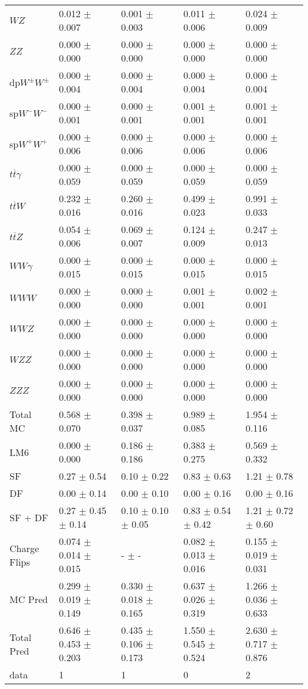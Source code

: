 \begin{tabular}{l | l l l l}
$WZ$ &  0.012 $\pm$  0.007 &  0.001 $\pm$  0.003 &  0.011 $\pm$  0.006 &  0.024 $\pm$  0.009\\
$ZZ$ &  0.000 $\pm$   0.000 &  0.000 $\pm$   0.000 &   0.000 $\pm$   0.000 &   0.000 $\pm$   0.000\\
\hline
dp$W^{\pm}W^{\pm}$ &  0.000 $\pm$  0.004 &  0.000 $\pm$  0.004 &  0.000 $\pm$  0.004 &  0.000 $\pm$  0.004\\
sp$W^{-}W^{-}$ &  0.000 $\pm$  0.001 &  0.000 $\pm$  0.001 &  0.001 $\pm$  0.001 &  0.001 $\pm$  0.001\\
sp$W^{+}W^{+}$ &  0.000 $\pm$  0.006 &  0.000 $\pm$  0.006 &  0.000 $\pm$  0.006 &  0.000 $\pm$  0.006\\
$t\overline{t}\gamma$ &  0.000 $\pm$  0.059 &  0.000 $\pm$  0.059 &  0.000 $\pm$  0.059 &  0.000 $\pm$  0.059\\
$t\overline{t}W$ &  0.232 $\pm$  0.016 &  0.260 $\pm$  0.016 &  0.499 $\pm$  0.023 &  0.991 $\pm$  0.033\\
$t\overline{t}Z$ &  0.054 $\pm$  0.006 &  0.069 $\pm$  0.007 &  0.124 $\pm$  0.009 &  0.247 $\pm$  0.013\\
$WW\gamma$ &  0.000 $\pm$  0.015 &  0.000 $\pm$  0.015 &  0.000 $\pm$  0.015 &  0.000 $\pm$  0.015\\
$WWW$ &   0.000 $\pm$   0.000 &   0.000 $\pm$   0.000 &  0.001 $\pm$  0.001 &  0.002 $\pm$  0.001\\
$WWZ$ &  0.000 $\pm$   0.000 &  0.000 $\pm$   0.000 &  0.000 $\pm$   0.000 &  0.000 $\pm$   0.000\\
$WZZ$ &   0.000 $\pm$   0.000 &   0.000 $\pm$   0.000 &   0.000 $\pm$   0.000 &   0.000 $\pm$   0.000\\
$ZZZ$ &  0.000 $\pm$   0.000 &   0.000 $\pm$   0.000 &   0.000 $\pm$   0.000 &   0.000 $\pm$   0.000\\
\hline
Total MC &  0.568 $\pm$  0.070 &  0.398 $\pm$  0.037 &  0.989 $\pm$  0.085 &  1.954 $\pm$  0.116\\
\hline\hline
\hline
LM6 &  0.000 $\pm$  0.000 &  0.186 $\pm$  0.186 &  0.383 $\pm$  0.275 &  0.569 $\pm$  0.332\\
\hline\hline
\hline\hline
 SF  & 0.27 $\pm$ 0.54 & 0.10 $\pm$ 0.22 & 0.83 $\pm$ 0.63 & 1.21 $\pm$ 0.78\\
 DF  & 0.00 $\pm$ 0.14 & 0.00 $\pm$ 0.10 & 0.00 $\pm$ 0.16 & 0.00 $\pm$ 0.16\\
\hline
 SF + DF  & 0.27 $\pm$ 0.45 $\pm$ 0.14 & 0.10 $\pm$ 0.10 $\pm$ 0.05 & 0.83 $\pm$ 0.54 $\pm$ 0.42 & 1.21 $\pm$ 0.72 $\pm$ 0.60\\
\hline\hline
Charge Flips & 0.074 $\pm$ 0.014 $\pm$ 0.015 & - $\pm$ - & 0.082 $\pm$ 0.013 $\pm$ 0.016 & 0.155 $\pm$ 0.019 $\pm$ 0.031\\
\hline\hline
\hline
MC Pred &  0.299 $\pm$  0.019 $\pm$  0.149 &  0.330 $\pm$  0.018 $\pm$  0.165 &  0.637 $\pm$  0.026 $\pm$  0.319 &  1.266 $\pm$  0.036 $\pm$  0.633\\
\hline\hline
Total Pred &  0.646 $\pm$  0.453 $\pm$  0.203 &  0.435 $\pm$  0.106 $\pm$  0.173 &  1.550 $\pm$  0.545 $\pm$  0.524 &  2.630 $\pm$  0.717 $\pm$  0.876\\
\hline\hline
data & 1 & 1 & 0 & 2\\
\hline\hline
\end{tabular}
